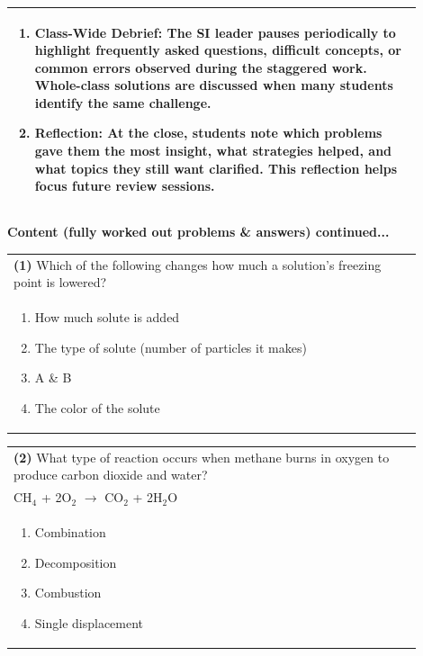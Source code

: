 \documentclass{article}
\begin{document}
\begin{tabular}{|p{0.9\linewidth}|}
\begin{enumerate}
    \item \textbf{Class-Wide Debrief:} The SI leader pauses periodically to highlight frequently asked questions, difficult concepts, or common errors observed during the staggered work. Whole-class solutions are discussed when many students identify the same challenge.
    
    \item \textbf{Reflection:} At the close, students note which problems gave them the most insight, what strategies helped, and what topics they still want clarified. This reflection helps focus future review sessions.
\end{enumerate} \\
\hline
\end{tabular}
\newpage

\noindent
{\large\textbf{Content (fully worked out problems \& answers) continued...}}\\[0.2em]
\vspace{0.2cm}



\noindent\begin{tabular}{|p{0.9\linewidth}|}
\hline
\textbf{(1)} Which of the following changes how much a solution’s freezing point is lowered?\\[0.2cm]
\begin{minipage}[t]{0.85\linewidth}
\begin{enumerate}[label=\alph*.]
\item How much solute is added
\item The type of solute (number of particles it makes)
\item A \& B
\item The color of the solute
\end{enumerate}
\end{minipage}\\[0.2cm]
\hline
\end{tabular}

\noindent\begin{tabular}{|p{0.9\linewidth}|}
\hline
\textbf{(2)} What type of reaction occurs when methane burns in oxygen to produce carbon dioxide and water?\\[0.2cm]
CH$_4$ + 2O$_2$ $\rightarrow$ CO$_2$ + 2H$_2$O\\[0.2cm]
\begin{minipage}[t]{0.85\linewidth}
\begin{enumerate}[label=\alph*.]
\item Combination
\item Decomposition
\item Combustion
\item Single displacement
\end{enumerate}
\end{minipage}\\[0.2cm]
\hline
\end{tabular}
\end{document}
